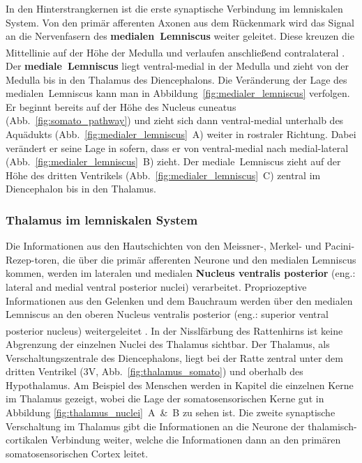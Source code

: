 \documentclass[12pt,a4paper,pdftex]{article}
\begin{document}
In den Hinterstrangkernen ist die erste synaptische Verbindung im lemniskalen System. Von den primär afferenten Axonen aus dem Rückenmark wird das Signal an die Nervenfasern des \textbf{medialen~Lemniscus}  weiter geleitet. Diese kreuzen die Mittellinie auf der Höhe der Medulla und verlaufen anschließend contralateral \textsuperscript{\cite[22]{kandel2013principles}}. 
Der \textbf{mediale~Lemniscus} liegt ventral-medial in der Medulla und zieht von der Medulla bis in den Thalamus des Diencephalons. Die Veränderung der Lage des medialen~Lemniscus  kann man in Abbildung~\ref{fig:medialer_lemniscus} verfolgen. Er beginnt bereits auf der Höhe des Nucleus cuneatus (Abb.~\ref{fig:somato_pathway}) und zieht sich dann ventral-medial unterhalb des Aquädukts (Abb.~\ref{fig:medialer_lemniscus}~A) weiter in rostraler Richtung. Dabei verändert er seine Lage in sofern, dass er von ventral-medial nach medial-lateral (Abb.~\ref{fig:medialer_lemniscus}~B) zieht. Der mediale~Lemniscus zieht auf der Höhe des dritten Ventrikels (Abb.~\ref{fig:medialer_lemniscus}~C) zentral im Diencephalon bis in den Thalamus.

\subsubsection*{Thalamus im lemniskalen System}
Die Informationen aus den Hautschichten von den Meissner-, Merkel- und Pacini-Rezep-toren, die über die primär afferenten Neurone und den medialen Lemniscus kommen, werden im lateralen und medialen \textbf{Nucleus ventralis posterior} (eng.: lateral and medial
ventral posterior nuclei)  verarbeitet. Propriozeptive Informationen aus den Gelenken und dem Bauchraum werden über den medialen Lemniscus an den oberen Nucleus ventralis posterior (eng.: superior ventral posterior nucleus) weitergeleitet \textsuperscript{\cite[22]{kandel2013principles}}. 
In der Nisslfärbung des Rattenhirns ist keine Abgrenzung der einzelnen Nuclei des Thalamus sichtbar. Der Thalamus, als Verschaltungszentrale des Diencephalons, liegt bei der Ratte zentral unter dem dritten Ventrikel (3V, Abb.~\ref{fig:thalamus_somato}) und oberhalb des Hypothalamus. 
Am Beispiel des Menschen werden in Kapitel \label{subsubsec:thalamus} die einzelnen Kerne im Thalamus gezeigt, wobei die Lage der somatosensorischen Kerne gut in Abbildung \ref{fig:thalamus_nuclei}~A~\&~B zu sehen ist.
Die zweite synaptische Verschaltung im Thalamus gibt die Informationen an die Neurone der thalamisch-cortikalen Verbindung weiter, welche die Informationen dann an den primären somatosensorischen Cortex leitet.
\end{document}
